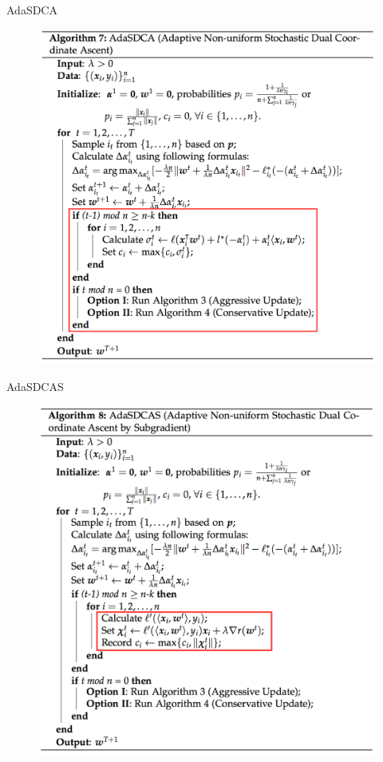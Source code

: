 \begin{frame}{AdaSDCA}
\begin{figure}[H]
        \includegraphics[height=0.8\textheight]{images/AdaSDCA.png} 
    \label{fig:AdaSDCA}
\end{figure}
\end{frame}

\begin{frame}{AdaSDCAS}
\begin{figure}[H]
        \includegraphics[height=0.8\textheight]{images/AdaSDCAS.png} 
    \label{fig:AdaSDCA}
\end{figure}
\end{frame}
